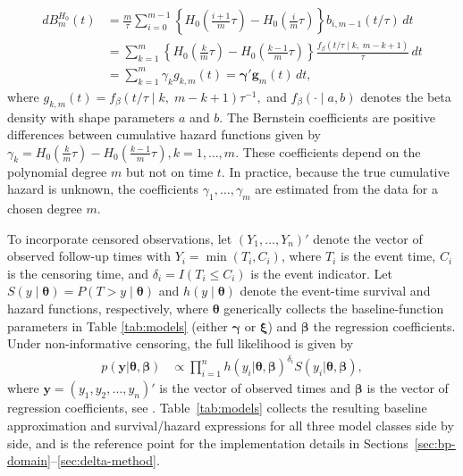 \documentclass[5p,lefttitle]{elsarticle}
\begin{document}
{\footnotesize\begin{align}
dB_m^{H_0}(t)
&=
\frac{m}{\tau}
\sum_{i=0}^{m-1}
\left\{
H_0\!\left(\frac{i+1}{m}\tau\right)
-
H_0\!\left(\frac{i}{m}\tau\right)
\right\}
b_{i,m-1}(t/\tau)\,dt \nonumber \\
&=
\sum_{k=1}^m
\left\{
H_0\!\left(\frac{k}{m}\tau\right)
-
H_0\!\left(\frac{k-1}{m}\tau\right)
\right\}
\frac{f_{\beta}(t/\tau\mid k,\;m-k+1)}{\tau}\,dt \nonumber \\
&=
\sum_{k=1}^m \gamma_k g_{k,m}(t) =\boldsymbol{\gamma}'\boldsymbol{g}_{m}(t)\,dt,
\end{align}\normalsize\label{eq:deriv} where
\(g_{k,m}(t)=f_{\beta}(t/\tau\mid k,\;m-k+1)\tau^{-1},\) and
\(f_{\beta}(\cdot\mid a,b)\) denotes the beta density with shape
parameters \(a\) and \(b\). The Bernstein coefficients are positive differences between cumulative hazard functions given by
\(\gamma_k=H_0\!\left(\frac{k}{m}\tau\right)-H_0\!\left(\frac{k-1}{m}\tau\right), k=1,\dots,m.\)
These coefficients depend on the polynomial degree \(m\) but not on time
\(t\). In practice, because the true cumulative hazard is unknown, the
coefficients \(\gamma_1,\dots,\gamma_m\) are estimated from the data for a
chosen degree \(m\).

To incorporate censored observations, let \((Y_1,\dots,Y_n)'\) denote the
vector of observed follow-up times with \(Y_i=\min(T_i,C_i)\), where \(T_i\)
is the event time, \(C_i\) is the censoring time, and
\(\delta_i=I(T_i\le C_i)\) is the event indicator. Let
\(S(y\mid\boldsymbol\theta)=P(T> y\mid\boldsymbol\theta)\) and
\(h(y\mid\boldsymbol\theta)\) denote the event-time survival and hazard
functions, respectively, where \(\boldsymbol\theta\) generically collects the
baseline-function parameters in Table \ref{tab:models} (either \(\boldsymbol{\gamma}\) or \(\boldsymbol{\xi}\)) and \(\boldsymbol\beta\) the regression
coefficients. Under non-informative censoring, the full likelihood is
given by
{\begin{align}
p(\boldsymbol{y} \vert \boldsymbol \theta, \boldsymbol{\beta})
&\propto \prod\limits_{i = 1}^{n} h(y_i \vert \boldsymbol \theta,\boldsymbol{\beta})^{\delta_i}  S(y_i \vert \boldsymbol \theta,\boldsymbol{\beta}),
\end{align}\normalsize}
where \(\boldsymbol{y}=(y_1, y_2, \dots, y_n)'\) is the
vector of observed times and \(\boldsymbol \beta\) is the vector of
regression coefficients, see \citet{Klein:1997}. Table~\ref{tab:models}
collects the resulting baseline approximation and survival/hazard
expressions for all three model classes side by side, and is the
reference point for the implementation details in
Sections~\ref{sec:bp-domain}--\ref{sec:delta-method}.

}
\end{document}
